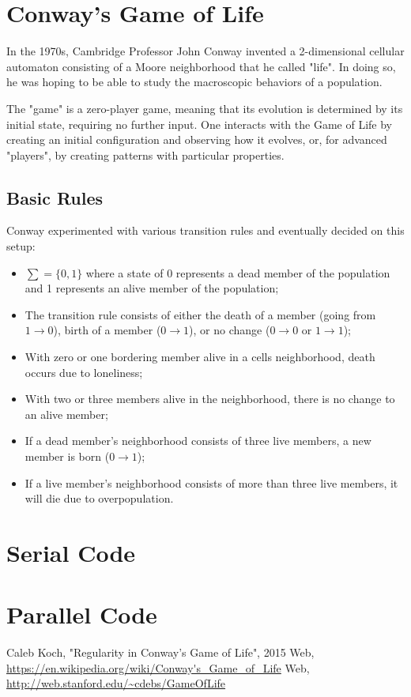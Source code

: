 \documentclass{report}
\begin{document}
\chapter{Conway's Game of Life}

In the 1970s, Cambridge Professor John Conway invented a 2-dimensional cellular automaton consisting of a Moore neighborhood that he called "life". In doing so, he was hoping to be able to study the macroscopic behaviors of a population.

\noindent The "game" is a zero-player game, meaning that its evolution is determined by its initial state, requiring no further input. One interacts with the Game of Life by creating an initial configuration and observing how it evolves, or, for advanced "players", by creating patterns with particular properties.

\section{Basic Rules}
Conway experimented with various transition rules and eventually decided on this setup:
\begin{itemize}

	\item $\sum = \{0, 1\}$ where a state of 0 represents a dead member of the population    and 1 represents an alive member of the population;
	\item The transition rule consists of either the death of a member (going from $1 \rightarrow 0$), birth of a member ($0 \rightarrow 1$), or no change ($0 \rightarrow 0$ or $1 \rightarrow 1$);
	\item With zero or one bordering member alive in a cells neighborhood, death occurs due to loneliness;
	\item With two or three members alive in the neighborhood, there is no change to an alive member;
	\item If a dead member's neighborhood consists of three live members, a new member is born ($0 \rightarrow 1$);
	\item If a live member's neighborhood consists of more than three live members, it will die due to overpopulation.
\end{itemize}


\appendix

\chapter{Serial Code}



\chapter{Parallel Code}



\begin{thebibliography}{9}
 Caleb Koch, "Regularity in Conway's Game of Life", 2015
 Web, \url{https://en.wikipedia.org/wiki/Conway's_Game_of_Life}
 Web, \url{http://web.stanford.edu/~cdebs/GameOfLife}
\end{thebibliography}
\end{document}
